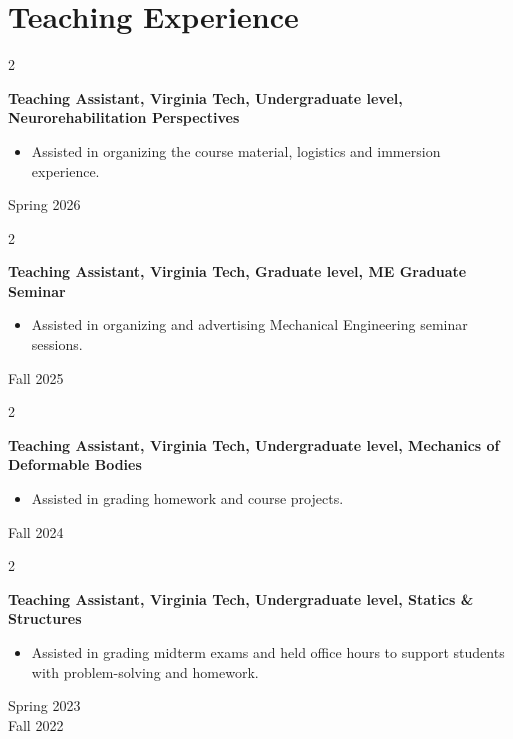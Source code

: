 \documentclass[10pt, letterpaper]{article}
\newenvironment{highlights}{
    \begin{itemize}[
        topsep=0.10 cm,
        parsep=0.10 cm,
        partopsep=0pt,
        itemsep=0pt,
        leftmargin=0.2 cm + 10pt
    ]
}{
    \end{itemize}
} %
\newenvironment{twocolentry}[2][]{
    \onecolentry
    \def\secondColumn{#2}
    \setcolumnwidth{\fill, 2.8 cm}
    \begin{paracol}{2}
}{
    \switchcolumn \raggedleft \secondColumn
    \end{paracol}
    \endonecolentry
} %
\begin{document}
\vspace{-.8em}
\section{Teaching Experience}

\begin{twocolentry}{
        Spring 2026 
        }
            \textbf{{{Teaching Assistant, 
            Virginia Tech, Undergraduate level, Neurorehabilitation Perspectives}}}\\
\vspace{-1em}
            \begin{highlights}

                 \item Assisted in organizing the course material, logistics and immersion experience.
        \end{highlights}
\end{twocolentry}

\begin{twocolentry}{
        Fall 2025 
        }
            \textbf{{{Teaching Assistant, 
            Virginia Tech, Graduate level, ME Graduate Seminar}}}\\
\vspace{-1em}
            \begin{highlights}

                 \item Assisted in organizing and advertising Mechanical Engineering seminar sessions.
        \end{highlights}
\end{twocolentry}

\begin{twocolentry}{
        Fall 2024 
        }
            \textbf{{{Teaching Assistant, 
            Virginia Tech, Undergraduate level, Mechanics of Deformable Bodies}}}\\
\vspace{-1em}
            \begin{highlights}

                 \item Assisted in grading homework and course projects.
        \end{highlights}
\end{twocolentry}

\begin{twocolentry}{
        Spring 2023\\
        Fall 2022\\
        }
            \textbf{{{Teaching Assistant, 
            Virginia Tech, Undergraduate level,  Statics \& Structures}}}\\
\vspace{-1em}
            \begin{highlights}

                 \item Assisted in grading midterm exams and held office hours to support students with problem-solving and homework.
        \end{highlights}
\end{twocolentry}
\end{document}
